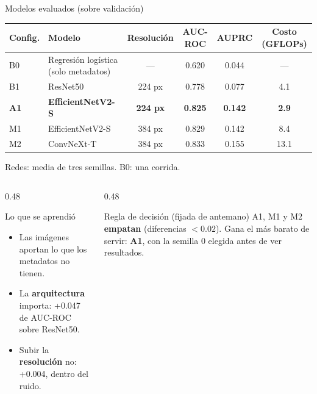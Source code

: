 \documentclass[aspectratio=169,10pt]{beamer}
\begin{document}
\begin{frame}{Modelos evaluados (sobre validación)}
  \begin{center}
    \small
    \begin{tabular}{llcccc}
      \toprule
      \textbf{Config.} & \textbf{Modelo} & \textbf{Resolución} & \textbf{AUC-ROC} & \textbf{AUPRC} & \textbf{Costo (GFLOPs)} \\
      \midrule
      B0 & Regresión logística (solo metadatos) & --- & 0.620 & 0.044 & --- \\
      B1 & ResNet50 & 224 px & 0.778 & 0.077 & 4.1 \\
      \textbf{A1} & \textbf{EfficientNetV2-S} & \textbf{224 px} & \textbf{0.825} & \textbf{0.142} & \textbf{2.9} \\
      M1 & EfficientNetV2-S & 384 px & 0.829 & 0.142 & 8.4 \\
      M2 & ConvNeXt-T & 384 px & 0.833 & 0.155 & 13.1 \\
      \bottomrule
    \end{tabular}
  \end{center}
  \vspace{-0.6em}
  \begin{center}
    \footnotesize Redes: media de tres semillas. B0: una corrida.
  \end{center}
  \vspace{-0.4em}
  \begin{columns}[T]
    \begin{column}{0.48\textwidth}
      \begin{block}{Lo que se aprendió}
        \begin{itemize}
          \item Las imágenes aportan lo que los metadatos no tienen.
          \item La \textbf{arquitectura} importa: +0.047 de AUC-ROC sobre ResNet50.
          \item Subir la \textbf{resolución} no: +0.004, dentro del ruido.
        \end{itemize}
      \end{block}
    \end{column}
    \begin{column}{0.48\textwidth}
      \begin{exampleblock}{Regla de decisión (fijada de antemano)}
        A1, M1 y M2 \textbf{empatan} (diferencias $<0.02$). Gana el más barato de servir: \textbf{A1}, con la semilla 0 elegida antes de ver resultados.
      \end{exampleblock}
    \end{column}
  \end{columns}
\end{frame}
\end{document}
